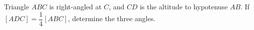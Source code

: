 Triangle $ABC$ is right-angled at $C$, and $CD$ is the altitude to hypotenuse $AB$. If $[ADC]=\dfrac{1}{4}[ABC]$, determine the three angles.
